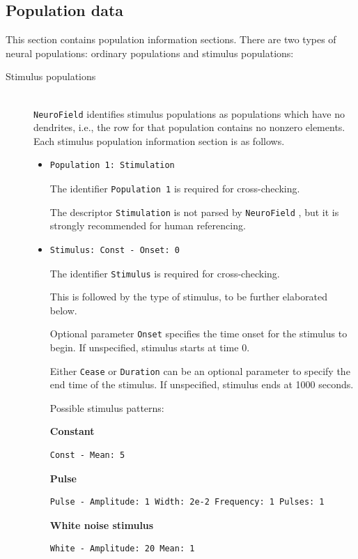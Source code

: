 \documentclass[12pt,a4paper]{article}
\newcommand{\type}[1]{ {\small\small\tt #1} }
\newcommand{\NF}[0]{ \type{NeuroField}}
\begin{document}
\subsection{Population data}
\label{sec:pop}
This section contains population information sections. There are two types of neural populations: ordinary populations and stimulus populations:
\begin{description}

\item[Stimulus populations]\ \\

\NF identifies stimulus populations as populations which have no dendrites, i.e., the row for that population contains no nonzero elements.  Each stimulus population information section is as follows.
\begin{itemize}
	\item \begin{lstlisting}
Population 1: Stimulation
	\end{lstlisting}
	The identifier \type{Population 1} is required for cross-checking.

	The descriptor \type{Stimulation} is not parsed by \NF, but it is strongly recommended for human referencing.
	\item
	\begin{lstlisting}
Stimulus: Const - Onset: 0
	\end{lstlisting}
	The identifier \type{Stimulus} is required for cross-checking.

	This is followed by the type of stimulus, to be further elaborated below.

	Optional parameter \type{Onset} specifies the time onset for the stimulus to begin. If unspecified, stimulus starts at time 0.

	Either \type{Cease} or \type{Duration} can be an optional parameter to specify the end time of the stimulus. If unspecified, stimulus ends at 1000 seconds.

	Possible stimulus patterns:

	\textbf{Constant}
	\begin{lstlisting}
Const - Mean: 5
	\end{lstlisting}

	\textbf{Pulse}
	\begin{lstlisting}
Pulse - Amplitude: 1 Width: 2e-2 Frequency: 1 Pulses: 1
	\end{lstlisting}

	\textbf{White noise stimulus}
	\begin{lstlisting}
White - Amplitude: 20 Mean: 1
	\end{lstlisting}


\end{itemize}
\end{description}
\end{document}
